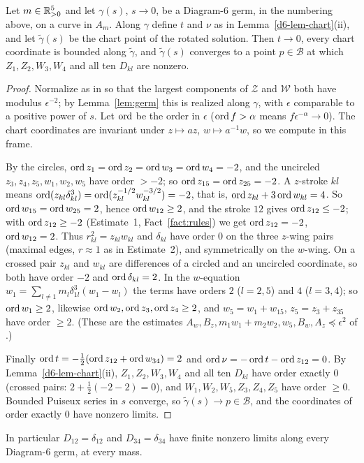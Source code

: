 \begin{proposition}[Coverage]\label{prop:d6-cover}
Let $m\in\mathbb{R}_{>0}^5$ and let $\gamma(s)$, $s\to0$, be a Diagram-6 germ, in the numbering above, on a
curve in $A_m$.  Along $\gamma$ define $t$ and $\nu$ as in Lemma~\ref{d6-lem-chart}(ii), and
let $\tilde\gamma(s)$ be the chart point of the rotated solution.  Then $t\to0$, every chart
coordinate is bounded along $\tilde\gamma$, and $\tilde\gamma(s)$ converges to a point
$p\in\mathcal B$ at which $Z_1,Z_2,W_3,W_4$ and all ten $D_{kl}$ are nonzero.
\end{proposition}

\begin{proof}
Normalize as in \cite[p.~547]{AK} so that the largest components of $\mathcal Z$ and $\mathcal W$
both have modulus $\epsilon^{-2}$; by Lemma~\ref{lem:germ} this is realized along $\gamma$, with
$\epsilon$ comparable to a positive power of $s$.  Let $\operatorname{ord}$ be the order in $\epsilon$
($\operatorname{ord} f>\alpha$ means $f\epsilon^{-\alpha}\to0$).  The chart coordinates are invariant under
$z\mapsto az$, $w\mapsto a^{-1}w$, so we compute in this frame.

By the circles, $\operatorname{ord} z_1=\operatorname{ord} z_2=\operatorname{ord} w_3=\operatorname{ord} w_4=-2$, and the uncircled
$z_3,z_4,z_5,w_1,w_2,w_5$ have order $>-2$; so $\operatorname{ord} z_{15}=\operatorname{ord} z_{25}=-2$.  A $z$-stroke $kl$
means $\operatorname{ord}(z_{kl}\delta_{kl}^3)=\operatorname{ord}(z_{kl}^{-1/2}w_{kl}^{-3/2})=-2$, that is,
$\operatorname{ord} z_{kl}+3\operatorname{ord} w_{kl}=4$.  So $\operatorname{ord} w_{15}=\operatorname{ord} w_{25}=2$, hence $\operatorname{ord} w_{12}\ge2$, and the
stroke $12$ gives $\operatorname{ord} z_{12}\le-2$; with $\operatorname{ord} z_{12}\ge-2$ (Estimate~1,
Fact~\ref{fact:rules}) we get $\operatorname{ord} z_{12}=-2$, $\operatorname{ord} w_{12}=2$.  Thus $r_{kl}^2=z_{kl}w_{kl}$ and
$\delta_{kl}$ have order $0$ on the three $z$-wing pairs (maximal edges, $r\approx1$ as in
Estimate~2), and symmetrically on the $w$-wing.  On a crossed pair $z_{kl}$ and $w_{kl}$ are
differences of a circled and an uncircled coordinate, so both have order $-2$ and
$\operatorname{ord}\delta_{kl}=2$.  In the $w$-equation $w_1=\sum_{l\ne1}m_l\delta_{1l}^3(w_1-w_l)$ the terms
have orders $2$ ($l=2,5$) and $4$ ($l=3,4$); so $\operatorname{ord} w_1\ge2$, likewise
$\operatorname{ord} w_2,\operatorname{ord} z_3,\operatorname{ord} z_4\ge2$, and $w_5=w_1+w_{15}$, $z_5=z_3+z_{35}$ have order $\ge2$.
(These are the estimates $A_w,B_z,m_1w_1+m_2w_2,w_5,B_w,A_z\preccurlyeq\epsilon^2$ of
\cite[\S8.6]{AK}.)

Finally $\operatorname{ord} t=-\frac12(\operatorname{ord} z_{12}+\operatorname{ord} w_{34})=2$ and $\operatorname{ord}\nu=-\operatorname{ord} t-\operatorname{ord} z_{12}=0$.  By
Lemma~\ref{d6-lem-chart}(ii), $Z_1,Z_2,W_3,W_4$ and all ten $D_{kl}$ have order exactly $0$
(crossed pairs: $2+\frac12(-2-2)=0$), and $W_1,W_2,W_5,Z_3,Z_4,Z_5$ have order $\ge0$.  Bounded
Puiseux series in $s$ converge, so $\tilde\gamma(s)\to p\in\mathcal B$, and the coordinates of
order exactly $0$ have nonzero limits.
\end{proof}
In particular $D_{12}=\delta_{12}$ and $D_{34}=\delta_{34}$ have finite nonzero limits along every
Diagram-6 germ, at every mass.

